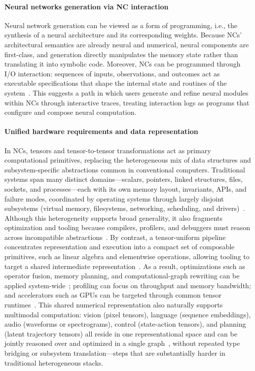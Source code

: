 \paragraph{Neural networks generation via NC interaction}
Neural network generation can be viewed as a form of programming, i.e., the synthesis of a neural architecture and its corresponding weights. Because NCs' architectural semantics are already neural and numerical, neural components are first-class, and generation directly manipulates the memory state rather than translating it into symbolic code. Moreover, NCs can be programmed through I/O interaction: sequences of inputs, observations, and outcomes act as executable specifications that shape the internal state and routines of the system~\citep{cypher1993watch,myers2002demonstrational}. This suggests a path in which users generate and refine neural modules within NCs through interactive traces, treating interaction logs as programs that configure and compose neural computation.

\paragraph{Unified hardware requirements and data representation}
In NCs, tensors and tensor-to-tensor transformations act as primary computational primitives, replacing the heterogeneous mix of data structures and subsystem-specific abstractions common in conventional computers. Traditional systems span many distinct domains—scalars, pointers, linked structures, files, sockets, and processes—each with its own memory layout, invariants, APIs, and failure modes, coordinated by operating systems through largely disjoint subsystems (virtual memory, filesystems, networking, scheduling, and drivers)~\citep{tanenbaum2013structured,silberschatz2019operating}. Although this heterogeneity supports broad generality, it also fragments optimization and tooling because compilers, profilers, and debuggers must reason across incompatible abstractions~\citep{gregg2014systems}. By contrast, a tensor-uniform pipeline concentrates representation and execution into a compact set of composable primitives, such as linear algebra and elementwise operations, allowing tooling to target a shared intermediate representation~\citep{paszke2019pytorch}. As a result, optimizations such as operator fusion, memory planning, and computational-graph rewriting can be applied system-wide~\citep{vasilache2018tensor}; profiling can focus on throughput and memory bandwidth; and accelerators such as GPUs can be targeted through common tensor runtimes~\citep{sze2017efficient}. This shared numerical representation also naturally supports multimodal computation: vision (pixel tensors), language (sequence embeddings), audio (waveforms or spectrograms), control (state-action tensors), and planning (latent trajectory tensors) all reside in one representational space and can be jointly reasoned over and optimized in a single graph~\citep{ramachandram2017deep}, without repeated type bridging or subsystem translation—steps that are substantially harder in traditional heterogeneous stacks.

